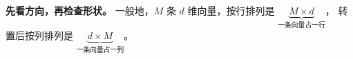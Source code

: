 \begin{minipage}{\linewidth}
\begin{tcolorbox}
\textbf{先看方向，再检查形状。}
一般地，$M$ 条 $d$ 维向量，按行排列是
$\underbrace{M\times d}_{\text{一条向量占一行}}$，
转置后按列排列是
$\underbrace{d\times M}_{\text{一条向量占一列}}$。
\end{tcolorbox}

\begin{center}\label{fig:row-column}\end{center}
\tagstructend
\end{minipage}\par
